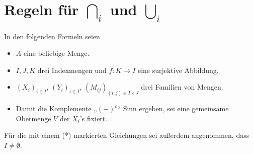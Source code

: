 \section{Regeln für $\bigcap_i$ und $\bigcup_i$} \label{anhang:bigcapcupregeln}
In den folgenden Formeln seien
\begin{itemize}
    \item $A$ eine beliebige Menge.
    \item $I,J,K$ drei Indexmengen und $f:K\to I$ eine surjektive Abbildung.
    \item $(X_i)_{i\in I}$, $(Y_i)_{i\in I}$, $(M_{ij})_{(i,j)\in I\times J}$ drei Familien von Mengen.
    \item Damit die Komplemente „$(-)^c$“ Sinn ergeben, sei eine gemeinsame Obermenge $V$ der $X_i$'s fixiert.
\end{itemize}
Für die mit einem (*) markierten Gleichungen sei außerdem angenommen, dass $I\neq\emptyset$.
\begingroup
\allowdisplaybreaks
